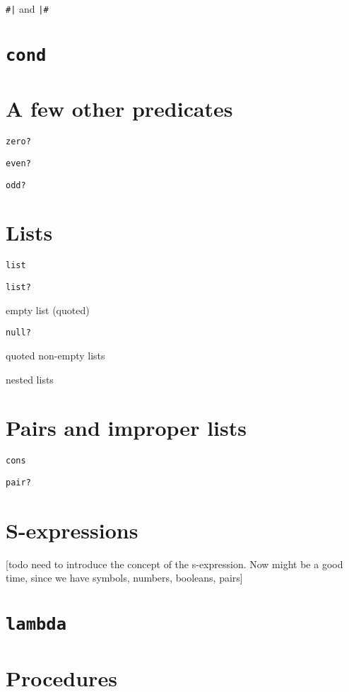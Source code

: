 \documentclass{book}
\begin{document}
\texttt{\#|} and
\texttt{|\#}

\section{\texttt{cond}}

\section{A few other predicates}

\verb|zero?|

\verb|even?|

\verb|odd?|

\section{Lists}

\verb|list|

\verb|list?|

empty list (quoted)

\verb|null?|

quoted non-empty lists

nested lists




\section{Pairs and improper lists}

\verb|cons|

\verb|pair?|

\section{S-expressions}

[todo need to introduce the concept of the s-expression.  Now might be a good time, since we have symbols, numbers, booleans, pairs]

\section{\texttt{lambda}}

\section{Procedures}
\end{document}
